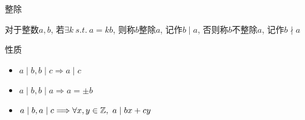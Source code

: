 \begin{frame}[fragile]{整除}
	\begin{definition}[整除]
		\label{prime:def:div}

		对于整数\(a,b\), 若\(\exists k~s.t.~a=kb\), 则称\(b\)整除\(a\), 记作\(b\mid a\), 否则称\(b\)不整除\(a\), 记作\(b\nmid a\)
	\end{definition}
\end{frame}


\begin{frame}[fragile]{性质}
	\label{prime:prop:div}

	\begin{itemize}
		\item<1-> \(a\mid b,b\mid c\Longrightarrow a\mid c\)
		\item<2-> \(a\mid b,b\mid a\Longrightarrow a=\pm b\)
		\item<3-> \(a\mid b,a\mid c\Longrightarrow\forall x,y\in\Bbb{Z},~a\mid bx+cy\)
	\end{itemize}
\end{frame}
